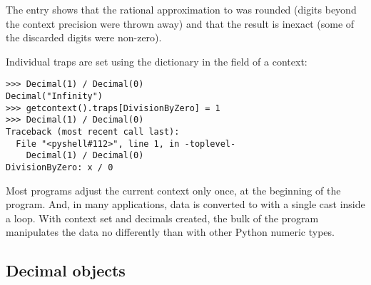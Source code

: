 The  entry shows that the rational approximation to 
was rounded (digits beyond the context precision were thrown away) and that
the result is inexact (some of the discarded digits were non-zero).

Individual traps are set using the dictionary in the 
field of a context:

\begin{verbatim}
>>> Decimal(1) / Decimal(0)
Decimal("Infinity")
>>> getcontext().traps[DivisionByZero] = 1
>>> Decimal(1) / Decimal(0)
Traceback (most recent call last):
  File "<pyshell#112>", line 1, in -toplevel-
    Decimal(1) / Decimal(0)
DivisionByZero: x / 0
\end{verbatim}

Most programs adjust the current context only once, at the beginning of the
program.  And, in many applications, data is converted to  with
a single cast inside a loop.  With context set and decimals created, the bulk
of the program manipulates the data no differently than with other Python
numeric types.



\subsection{Decimal objects \label{decimal-decimal}}

